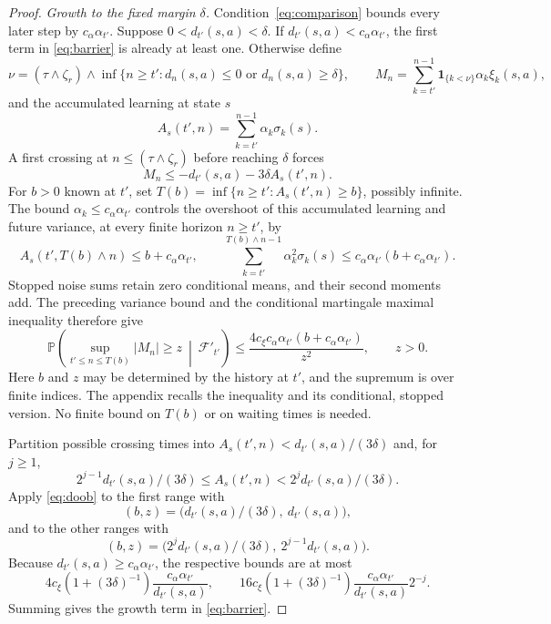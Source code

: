 \begin{proof}
\emph{Growth to the fixed margin $\delta$.} Condition~\eqref{eq:comparison} bounds every later step by $c_\alpha\alpha_{t'}$. Suppose $0<d_{t'}(s,a)<\delta$. If $d_{t'}(s,a)<c_\alpha\alpha_{t'}$, the first term in \eqref{eq:barrier} is already
at least one. Otherwise define
\[
\nu=(\tau\wedge\zeta_r)\wedge\inf\{n\ge t':d_n(s,a)\le0\text{ or }d_n(s,a)\ge\delta\},\qquad
M_n=\sum_{k=t'}^{n-1}\mathbf1_{\{k<\nu\}}\alpha_k\xi_k(s,a),
\]
and the accumulated learning at state $s$
\begin{equation}\label{eq:clock}
A_s(t',n)=\sum_{k=t'}^{n-1}\alpha_k\sigma_k(s).
\end{equation}
A first crossing at $n\le(\tau\wedge\zeta_r)$ before reaching $\delta$ forces
\begin{equation}\label{eq:crossing}
M_n\le-d_{t'}(s,a)-3\delta A_s(t',n).
\end{equation}
For $b>0$ known at $t'$, set $T(b)=\inf\{n\ge t':A_s(t',n)\ge b\}$, possibly infinite. The bound $\alpha_k\le c_\alpha\alpha_{t'}$ controls the overshoot of this accumulated learning and future variance, at every finite horizon $n\ge t'$, by
\[
A_s(t',T(b)\wedge n)\le b+c_\alpha\alpha_{t'},\qquad
\sum_{k=t'}^{T(b)\wedge n-1}\alpha_k^2\sigma_k(s)\le c_\alpha\alpha_{t'}(b+c_\alpha\alpha_{t'}).
\]
Stopped noise sums retain zero conditional means, and their second moments add. The preceding variance bound and the conditional martingale maximal inequality therefore give
\begin{equation}\label{eq:doob}
\mathbb P\!\left(\sup_{t'\le n\le T(b)}|M_n|\ge z\ \middle|\ \mathcal F'_{t'}\right)
\le\frac{4c_\xi c_\alpha\alpha_{t'}(b+c_\alpha\alpha_{t'})}{z^2},\qquad z>0.
\end{equation}
Here $b$ and $z$ may be determined by the history at $t'$, and the supremum is over finite indices. The appendix recalls the inequality and its conditional, stopped version. No finite bound on $T(b)$ or on waiting times is needed.

Partition possible crossing times into $A_s(t',n)<d_{t'}(s,a)/(3\delta)$ and, for $j\ge1$,
\[
2^{j-1}d_{t'}(s,a)/(3\delta)\le A_s(t',n)<2^jd_{t'}(s,a)/(3\delta).
\]
Apply \eqref{eq:doob} to the first range with
\[
(b,z)=\big(d_{t'}(s,a)/(3\delta),\ d_{t'}(s,a)\big),
\]
and to the other ranges with
\[
(b,z)=\big(2^jd_{t'}(s,a)/(3\delta),\ 2^{j-1}d_{t'}(s,a)\big).
\]
Because $d_{t'}(s,a)\ge c_\alpha\alpha_{t'}$, the respective bounds are at most
\[
4c_\xi(1+(3\delta)^{-1})\frac{c_\alpha\alpha_{t'}}{d_{t'}(s,a)},\qquad
16c_\xi(1+(3\delta)^{-1})\frac{c_\alpha\alpha_{t'}}{d_{t'}(s,a)}2^{-j}.
\]
Summing gives the growth term in \eqref{eq:barrier}.


\end{proof}
